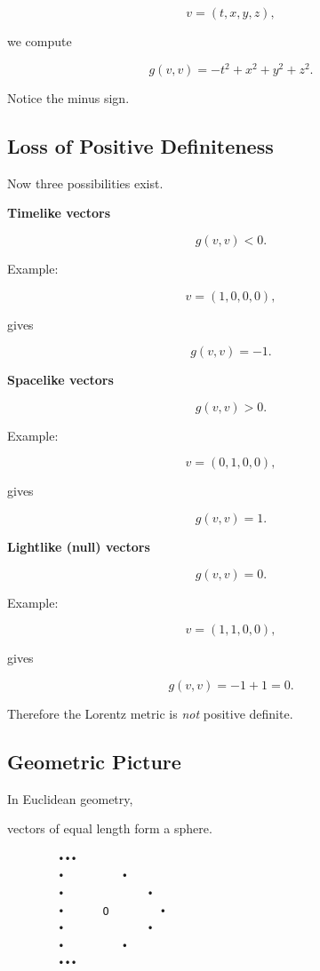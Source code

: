 \documentclass[12pt,a4paper]{article}
\theoremstyle{notespace}
\begin{document}
\[
v=(t,x,y,z),
\]

we compute

\[
g(v,v)
=
-t^2+x^2+y^2+z^2.
\]

Notice the minus sign.


\subsection{Loss of Positive Definiteness}

Now three possibilities exist.

\bigskip

\textbf{Timelike vectors}

\[
g(v,v)<0.
\]

Example:

\[
v=(1,0,0,0),
\]

gives

\[
g(v,v)=-1.
\]

\bigskip

\textbf{Spacelike vectors}

\[
g(v,v)>0.
\]

Example:

\[
v=(0,1,0,0),
\]

gives

\[
g(v,v)=1.
\]

\bigskip

\textbf{Lightlike (null) vectors}

\[
g(v,v)=0.
\]

Example:

\[
v=(1,1,0,0),
\]

gives

\[
g(v,v)
=
-1+1
=
0.
\]

Therefore the Lorentz metric is \emph{not} positive definite.


\subsection{Geometric Picture}

In Euclidean geometry,

vectors of equal length form a sphere.

\bigskip

\begin{center}
	\begin{verbatim}
		•••
		•         •
		•             •
		•      O        •
		•             •
		•         •
		•••
	\end{verbatim}
\end{center}
\end{document}
